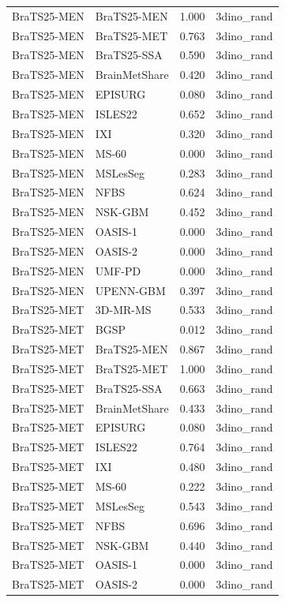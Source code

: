 \begin{tabular}{llrl}
BraTS25-MEN & BraTS25-MEN & 1.000 & 3dino\_rand \\
BraTS25-MEN & BraTS25-MET & 0.763 & 3dino\_rand \\
BraTS25-MEN & BraTS25-SSA & 0.590 & 3dino\_rand \\
BraTS25-MEN & BrainMetShare & 0.420 & 3dino\_rand \\
BraTS25-MEN & EPISURG & 0.080 & 3dino\_rand \\
BraTS25-MEN & ISLES22 & 0.652 & 3dino\_rand \\
BraTS25-MEN & IXI & 0.320 & 3dino\_rand \\
BraTS25-MEN & MS-60 & 0.000 & 3dino\_rand \\
BraTS25-MEN & MSLesSeg & 0.283 & 3dino\_rand \\
BraTS25-MEN & NFBS & 0.624 & 3dino\_rand \\
BraTS25-MEN & NSK-GBM & 0.452 & 3dino\_rand \\
BraTS25-MEN & OASIS-1 & 0.000 & 3dino\_rand \\
BraTS25-MEN & OASIS-2 & 0.000 & 3dino\_rand \\
BraTS25-MEN & UMF-PD & 0.000 & 3dino\_rand \\
BraTS25-MEN & UPENN-GBM & 0.397 & 3dino\_rand \\
BraTS25-MET & 3D-MR-MS & 0.533 & 3dino\_rand \\
BraTS25-MET & BGSP & 0.012 & 3dino\_rand \\
BraTS25-MET & BraTS25-MEN & 0.867 & 3dino\_rand \\
BraTS25-MET & BraTS25-MET & 1.000 & 3dino\_rand \\
BraTS25-MET & BraTS25-SSA & 0.663 & 3dino\_rand \\
BraTS25-MET & BrainMetShare & 0.433 & 3dino\_rand \\
BraTS25-MET & EPISURG & 0.080 & 3dino\_rand \\
BraTS25-MET & ISLES22 & 0.764 & 3dino\_rand \\
BraTS25-MET & IXI & 0.480 & 3dino\_rand \\
BraTS25-MET & MS-60 & 0.222 & 3dino\_rand \\
BraTS25-MET & MSLesSeg & 0.543 & 3dino\_rand \\
BraTS25-MET & NFBS & 0.696 & 3dino\_rand \\
BraTS25-MET & NSK-GBM & 0.440 & 3dino\_rand \\
BraTS25-MET & OASIS-1 & 0.000 & 3dino\_rand \\
BraTS25-MET & OASIS-2 & 0.000 & 3dino\_rand \\

\end{tabular}

